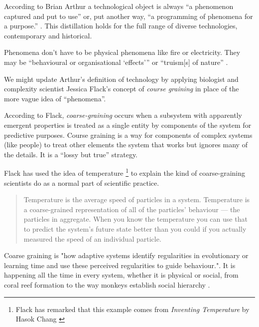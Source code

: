 \documentclass[letterpaper]{article}
\begin{document}
    According to Brian Arthur a technological object is always “a phenomenon captured and put to use” \citep[p.53]{theNatureOfTechnology2009} or, put another way, “a programming of phenomena for a purpose.” \citep[p.53]{theNatureOfTechnology2009}. This distillation holds for the full range of diverse technologies, contemporary and historical.

    Phenomena don't have to be physical phenomena like fire or electricity. They may be “behavioural or organisational ‘effects’” \citep[p.55]{theNatureOfTechnology2009} or “truism[s] of nature” \citep[p.45]{theNatureOfTechnology2009}.
    
    We might update Arthur's definition of technology by applying biologist and complexity scientist Jessica Flack's concept of \emph{course graining} in place of the more vague idea of “phenomena”. 

    According to Flack, \emph{coarse-graining} occurs when a subsystem with apparently emergent properties is treated as a single entity by components of the system for predictive purposes. Course graining is a way for components of complex systems (like people) to treat other elements the system that works but ignores many of the details. It is a “lossy but true” \citep[p.4]{FlackCrsGrnng2017} strategy.
    
    Flack has used the idea of temperature \footnote{

        Flack has remarked that this example comes from \emph{Inventing Temperature} by Hasok Chang \citep{ChangInvntngTmprtr2004}

    } to explain the kind of coarse-graining scientists do as a normal part of scientific practice.

    \begin{quote}
        Temperature is the average speed of particles in a system. Temperature is a coarse-grained representation of all of the particles' behaviour — the particles in aggregate. When you know the temperature you can use that to predict the system's future state better than you could if you actually measured the speed of an individual particle. \citep[p.4]{FlackCrsGrnng2017}
    \end{quote}

    Coarse graining is "how adaptive systems identify regularities in evolutionary or learning time and use these perceived regularities to guide behaviour."\citep[p.2]{FlackCrsGrnngAsDwnwrdCstn2021}. It is happening all the time in every system, whether it is physical or social, from coral reef formation \citep[p.61]{FlackEtAlTmsclsSymmtryUncrtnty2013} to the way monkeys establish social hierarchy \citep{FlackCntxtMdltsSgnlMnng2007}.
\end{document}
